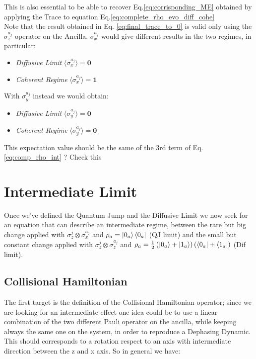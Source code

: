 \documentclass[a4paper,12pt]{article}
\begin{document}
	This is also essential to be able to recover Eq.\eqref{eq:corrisponding_ME} obtained by applying the Trace to equation Eq.\eqref{eq:complete_rho_evo_diff_cohe}\\

	Note that the result obtained in Eq. \eqref{eq:final_trace_to_0} is valid only using the $ \sigma_{z}^{a_j} $ operator on the Ancilla. $ \sigma_{x}^{a_j} $ would give different results in the two regimes, in particular:
	\begin{itemize}
		\item \textit{Diffusive Limit} $\langle \sigma_{x}^{a_j} \rangle = \textbf{0}$
		\item \textit{Coherent Regime} $\langle \sigma_{x}^{a_j} \rangle = \textbf{1}$
	\end{itemize}

	With $ \sigma_{y}^{a_j} $ instead we would obtain:
	\begin{itemize}
		\item \textit{Diffusive Limit} $\langle \sigma_{y}^{a_j} \rangle = \textbf{0}$
		\item \textit{Coherent Regime} $\langle \sigma_{y}^{a_j} \rangle = \textbf{0}$
	\end{itemize}

	This expectation value should be the same of the 3rd term of Eq.\eqref{eq:comp_rho_int} ? Check this

	\clearpage
	\newpage

	\section{Intermediate Limit}
	\label{sec:intermediate_limit}
	Once we've defined the Quantum Jump and the Diffusive Limit we now seek for an equation that can describe an intermediate regime, between the rare but big change applied with $ \sigma_{z}^{j} \otimes \sigma_{x}^{a_j} $ and $ \rho_a = \ket{0_a}\bra{0_a} $ (QJ limit) and the small but constant change applied with $ \sigma_{z}^{j} \otimes \sigma_{z}^{a_j}$ and $ \rho_a = \frac{1}{2} \left(\ket{0_a} + \ket{1_a}\right)\left(\bra{0_a} + \bra{1_a} \right) $ (Dif limit).

	\subsection{Collisional Hamiltonian}
	\label{sub:coll_hamiltonian_int}
	The first target is the definition of the Collisional Hamiltonian operator; since we are looking for an intermediate effect one idea could be to use a linear combination of the two different Pauli operator on the ancilla, while keeping always the same one on the system, in order to reproduce a Dephasing Dynamic. This should corresponds to a rotation respect to an axis with intermediate direction between the z and x axis. So in general we have:
\end{document}
